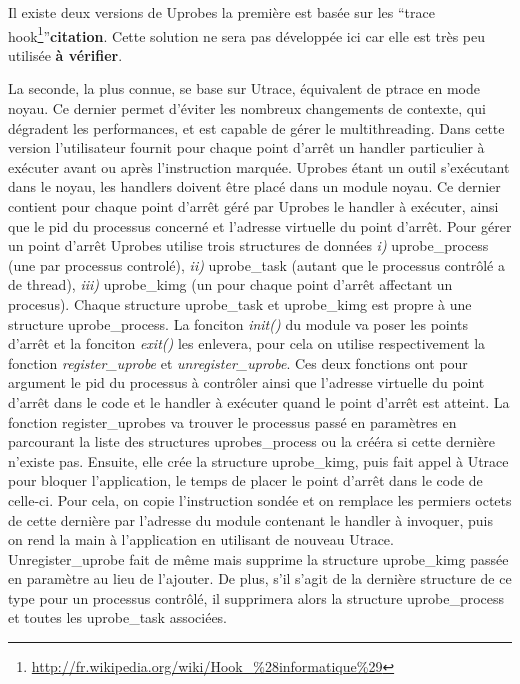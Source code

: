 Il existe deux versions de Uprobes la première est basée sur les ``trace
hook\footnote{\url{http://fr.wikipedia.org/wiki/Hook\_\%28informatique\%29}}''\textbf{{\color{red}citation}}. Cette
solution ne sera pas développée ici car elle est très peu utilisée
\textbf{{\color{red} à vérifier}}.

La seconde, la plus connue, se base sur Utrace, équivalent de ptrace en mode
noyau. Ce dernier permet d'éviter les nombreux changements de contexte, qui
dégradent les performances, et est capable de gérer le multithreading. Dans
cette version l'utilisateur fournit pour chaque point d'arrêt un handler
particulier à exécuter avant ou après l’instruction marquée. Uprobes étant un
outil s'exécutant dans le noyau, les handlers doivent être placé dans un module
noyau. Ce dernier contient pour chaque point d'arrêt géré par Uprobes le handler
à exécuter, ainsi que le pid du processus concerné et l'adresse virtuelle du
point d'arrêt. Pour gérer un point d'arrêt Uprobes utilise trois structures de
données \textit{i)} uprobe\_process (une par processus controlé), \textit{ii)}
uprobe\_task (autant que le processus contrôlé a de thread), \textit{iii)}
uprobe\_kimg (un pour chaque point d'arrêt affectant un procesus). Chaque
structure uprobe\_task et uprobe\_kimg est propre à une structure
uprobe\_process. La fonciton \textit{init()} du module va poser les points
d'arrêt et la fonciton \textit{exit()} les enlevera, pour cela on utilise
respectivement la fonction \textit{register\_uprobe} et
\textit{unregister\_uprobe}. Ces deux fonctions ont pour argument le pid du
processus à contrôler ainsi que l'adresse virtuelle du point d'arrêt dans le
code et le handler à exécuter quand le point d'arrêt est atteint. La fonction
register\_uprobes va trouver le processus passé en paramètres en parcourant la
liste des structures uprobes\_process ou la crééra si cette dernière n'existe
pas. Ensuite, elle crée la structure uprobe\_kimg, puis fait appel à Utrace pour
bloquer l'application, le temps de placer le point d'arrêt dans le code de
celle-ci. Pour cela, on copie l'instruction sondée et on remplace les permiers
octets de cette dernière par l'adresse du module contenant le handler à
invoquer, puis on rend la main à l'application en utilisant de nouveau Utrace.
Unregister\_uprobe fait de même mais supprime la structure uprobe\_kimg passée
en paramètre au lieu de l'ajouter. De plus, s'il s'agit de la dernière structure
de ce type pour un processus contrôlé, il supprimera alors la structure
uprobe\_process et toutes les uprobe\_task associées.

